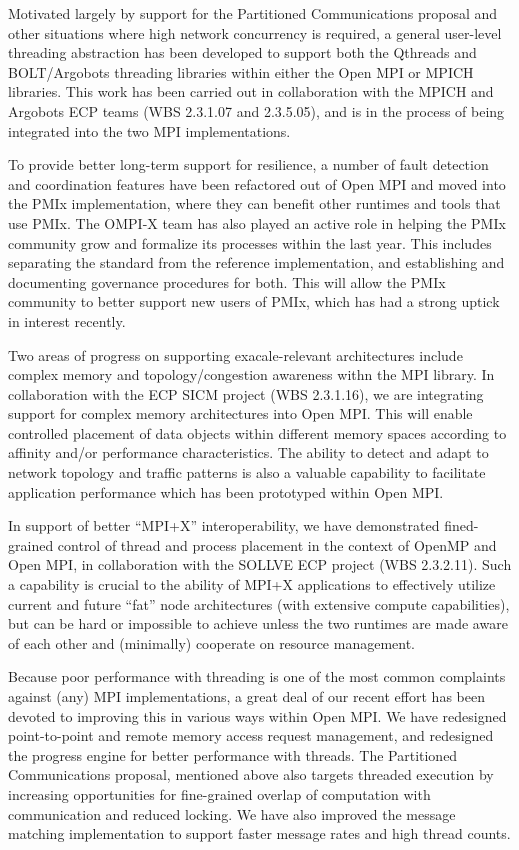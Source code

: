 Motivated largely by support for the Partitioned Communications proposal and other situations where high network concurrency is required, a general user-level threading abstraction has been developed to support both the Qthreads and BOLT/Argobots threading libraries within either the Open MPI or MPICH libraries.  This work has been carried out in collaboration with the MPICH and Argobots ECP teams (WBS 2.3.1.07 and 2.3.5.05), and is in the process of being integrated into the two MPI implementations.

To provide better long-term support for resilience, a number of fault detection and coordination features have been refactored out of Open MPI and moved into the PMIx implementation, where they can benefit other runtimes and tools that use PMIx.  The OMPI-X team has also played an active role in helping the PMIx community grow and formalize its processes within the last year.  This includes separating the standard from the reference implementation, and establishing and documenting governance procedures for both.
This will allow the PMIx community to better support new users of PMIx, which has had a strong uptick in interest recently.

Two areas of progress on supporting exacale-relevant architectures include complex memory and topology/congestion awareness withn the MPI library. In collaboration with the ECP SICM project (WBS 2.3.1.16), we are integrating support for complex memory architectures into Open MPI.  This will enable controlled placement of data objects within different memory spaces according to affinity and/or performance characteristics.  The ability to detect and adapt to network topology and traffic patterns is also a valuable capability to facilitate application performance which has been prototyped within Open MPI.

In support of better ``MPI+X'' interoperability, we have demonstrated fined-grained control of thread and process placement in the context of OpenMP and Open MPI, in collaboration with the SOLLVE ECP project (WBS 2.3.2.11). Such a capability is crucial to the ability of MPI+X applications to effectively utilize current and future ``fat'' node architectures (with extensive compute capabilities), but can be hard or impossible to achieve unless the two runtimes are made aware of each other and (minimally) cooperate on resource management.

Because poor performance with threading is one of the most common complaints against (any) MPI implementations, a great deal of our recent effort has been devoted to improving this in various ways within Open MPI.  We have redesigned point-to-point and remote memory access request management, and redesigned the progress engine for better performance with threads.  The Partitioned Communications proposal, mentioned above also targets threaded execution by increasing opportunities for fine-grained overlap of computation with communication and reduced locking.  We have also improved the message matching implementation to support faster message rates and high thread counts.

